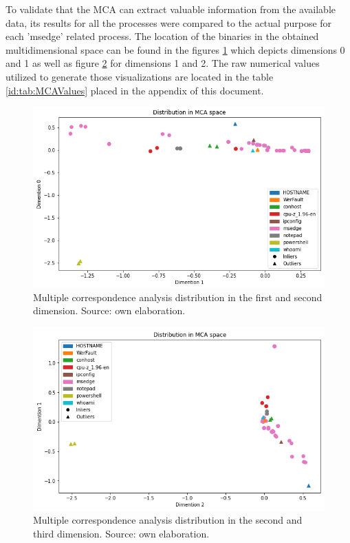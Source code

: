 \documentclass[a4paper,twoside,12pt]{book}
\begin{document}
To validate that the MCA can extract valuable information from the available data, its results for all
the processes were compared to the actual purpose for each 'msedge' related process. The location of the
binaries in the obtained multidimensional space can be found in the figures \ref{fig:mca01} which 
depicts dimensions 0 and 1 as well as figure \ref{fig:mca12} for dimensions 1 and 2. The raw numerical 
values utilized to generate those visualizations are located in the table \ref{id:tab:MCAValues} placed 
in the appendix of this document. 


\begin{figure}
	\centering
	\includegraphics[scale=0.9]{images/MCA01}
	\caption{Multiple correspondence analysis distribution in the first and second dimension. Source: own elaboration.}
	\label{fig:mca01}
 \end{figure}

 \begin{figure}
	\centering
	\includegraphics[scale=0.9]{images/MCA12}
	\caption{Multiple correspondence analysis distribution in the second and third dimension. Source: own elaboration.}
	\label{fig:mca12}
 \end{figure}
\end{document}
